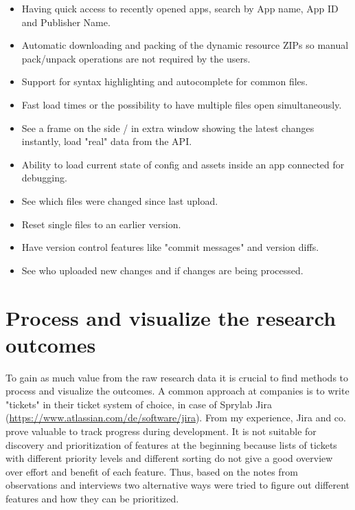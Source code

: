 \begin{description}[nosep]
  \item[App Selection] \leavevmode
  \begin{itemize}
    \item Having quick access to recently opened apps, search by App name, App ID and Publisher Name.
  \end{itemize}
  \item[App Editing] \leavevmode
  \begin{itemize}[itemsep=0mm]
    \item Automatic downloading and packing of the dynamic resource ZIPs so manual pack/unpack operations are not required by the users.
    \item Support for syntax highlighting and autocomplete for common files.
    \item Fast load times or the possibility to have multiple files open simultaneously.
  \end{itemize}
  \item[App Preview]\leavevmode
   \begin{itemize}[itemsep=0mm]
    \item See a frame on the side / in extra window showing the latest changes instantly, load "real" data from the API.
    \item Ability to load current state of config and assets inside an app connected for debugging.
  \end{itemize}
  \item[Dynamic Resource Change Management] \leavevmode
  \begin{itemize}[itemsep=0mm]
    \item See which files were changed since last upload.
    \item Reset single files to an earlier version.
    \item Have version control features like "commit messages" and version diffs.
    \item See who uploaded new changes and if changes are being processed.
  \end{itemize}
\end{description}


\section{Process and visualize the research outcomes}

To gain as much value from the raw research data it is crucial to find methods to process and visualize the outcomes.
A common approach at companies is to write "tickets" in their ticket system of choice, in case of Sprylab Jira (\url{https://www.atlassian.com/de/software/jira}).
From my experience, Jira and co. prove valuable to track progress during development.
It is not suitable for discovery and prioritization of features at the beginning because lists of tickets with different priority levels and different sorting do not give a good overview over effort and benefit of each feature.
Thus, based on the notes from observations and interviews two alternative ways were tried to figure out different features and how they can be prioritized.

